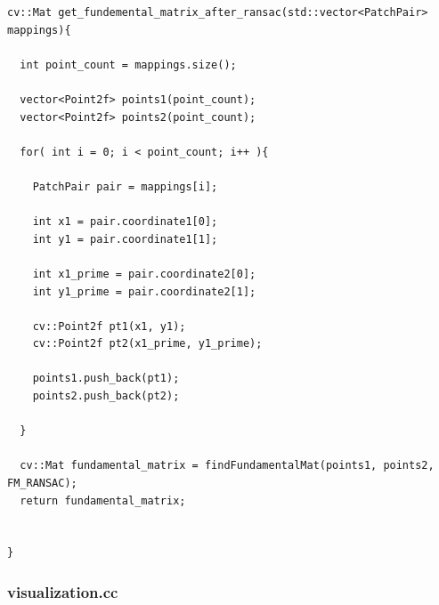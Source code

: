 \documentclass[letterpaper,11pt]{article}
\begin{document}
\begin{verbatim}
cv::Mat get_fundemental_matrix_after_ransac(std::vector<PatchPair> mappings){

  int point_count = mappings.size();

  vector<Point2f> points1(point_count);
  vector<Point2f> points2(point_count);

  for( int i = 0; i < point_count; i++ ){

    PatchPair pair = mappings[i];    

    int x1 = pair.coordinate1[0];
    int y1 = pair.coordinate1[1];

    int x1_prime = pair.coordinate2[0];
    int y1_prime = pair.coordinate2[1];    

    cv::Point2f pt1(x1, y1);
    cv::Point2f pt2(x1_prime, y1_prime);

    points1.push_back(pt1);
    points2.push_back(pt2);

  }

  cv::Mat fundamental_matrix = findFundamentalMat(points1, points2, FM_RANSAC);
  return fundamental_matrix;
    

}
\end{verbatim}

\subsubsection{visualization.cc}
\end{document}
